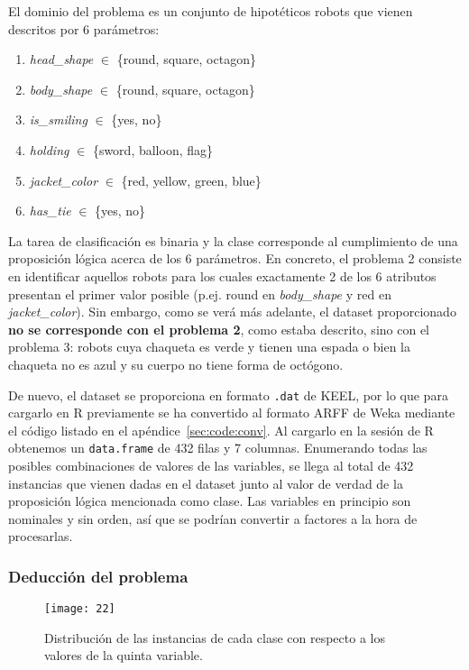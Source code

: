 \documentclass[a4paper, 11pt]{article}
\begin{document}
El dominio del problema es un conjunto de hipotéticos robots que vienen descritos por 6 parámetros:
\begin{enumerate}
\item \textit{head\_shape} $\in$ \{round, square, octagon\}
\item \textit{body\_shape} $\in$ \{round, square, octagon\}
\item \textit{is\_smiling} $\in$ \{yes, no\}
\item \textit{holding} $\in$ \{sword, balloon, flag\}
\item \textit{jacket\_color} $\in$ \{red, yellow, green, blue\}
\item \textit{has\_tie} $\in$ \{yes, no\}
\end{enumerate}


La tarea de clasificación es binaria y la clase corresponde al cumplimiento de una proposición lógica acerca de los 6 parámetros. En concreto, el problema 2 consiste en identificar aquellos robots para los cuales exactamente 2 de los 6 atributos presentan el primer valor posible (p.ej. round en \textit{body\_shape} y red en \textit{jacket\_color}). Sin embargo, como se verá más adelante, el dataset proporcionado \textbf{no se corresponde con el problema 2}, como estaba descrito, sino con el problema 3: robots cuya chaqueta es verde y tienen una espada o bien la chaqueta no es azul y su cuerpo no tiene forma de octógono.

De nuevo, el dataset se proporciona en formato \texttt{.dat} de KEEL, por lo que para cargarlo en R previamente se ha convertido al formato ARFF de Weka mediante el código listado en el apéndice~\ref{sec:code:conv}. Al cargarlo en la sesión de R obtenemos un \texttt{data.frame} de 432 filas y 7 columnas. Enumerando todas las posibles combinaciones de valores de las variables, se llega al total de 432 instancias que vienen dadas en el dataset junto al valor de verdad de la proposición lógica mencionada como clase. Las variables en principio son nominales y sin orden, así que se podrían convertir a factores a la hora de procesarlas.

\subsubsection{Deducción del problema}

\begin{wrapfigure}{r}{0.4\textwidth}
  \vspace{-2.5em}
  \texttt{[image: 22]}
  \caption{\label{fig:monkfail}Distribución de las instancias de cada clase con respecto a los valores de la quinta variable.}
\end{wrapfigure}
\end{document}
